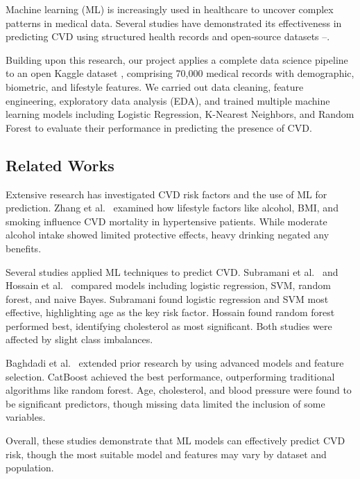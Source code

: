 \documentclass[conference]{IEEEtran}
\begin{document}
Machine learning (ML) is increasingly used in healthcare to uncover complex patterns in medical data. Several studies have demonstrated its effectiveness in predicting CVD using structured health records and open-source datasets \cite{RW1}–\cite{RW3}.

Building upon this research, our project applies a complete data science pipeline to an open Kaggle dataset \cite{DATA}, comprising 70,000 medical records with demographic, biometric, and lifestyle features. We carried out data cleaning, feature engineering, exploratory data analysis (EDA), and trained multiple machine learning models including Logistic Regression, K-Nearest Neighbors, and Random Forest to evaluate their performance in predicting the presence of CVD.


\subsection{Related Works}
Extensive research has investigated CVD risk factors and the use of ML for prediction. Zhang et al.~\cite{ALCOCVD} examined how lifestyle factors like alcohol, BMI, and smoking influence CVD mortality in hypertensive patients. While moderate alcohol intake showed limited protective effects, heavy drinking negated any benefits.

Several studies applied ML techniques to predict CVD. Subramani et al.~\cite{RW1} and Hossain et al.~\cite{RW2} compared models including logistic regression, SVM, random forest, and naive Bayes. Subramani found logistic regression and SVM most effective, highlighting age as the key risk factor. Hossain found random forest performed best, identifying cholesterol as most significant. Both studies were affected by slight class imbalances.

Baghdadi et al.~\cite{RW3} extended prior research by using advanced models and feature selection. CatBoost achieved the best performance, outperforming traditional algorithms like random forest. Age, cholesterol, and blood pressure were found to be significant predictors, though missing data limited the inclusion of some variables.

Overall, these studies demonstrate that ML models can effectively predict CVD risk, though the most suitable model and features may vary by dataset and population.
\end{document}
